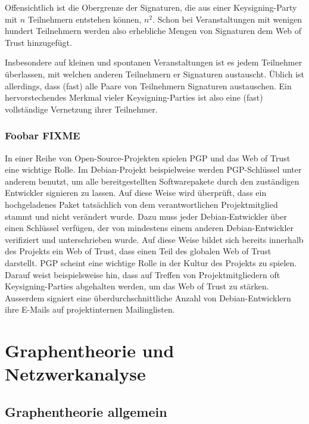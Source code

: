 Offensichtlich ist die Obergrenze der Signaturen, die aus einer
Keysigning-Party mit $n$ Teilnehmern entstehen k\"onnen, $n^2$. Schon
bei Veranstaltungen mit wenigen hundert Teilnehmern werden also
erhebliche Mengen von Signaturen dem Web of Trust hinzugef\"ugt.

Insbesondere auf kleinen und spontanen Veranstaltungen ist es jedem
Teilnehmer \"uberlassen, mit welchen anderen Teilnehmern er Signaturen
austauscht. \"Ublich ist allerdings, dass (fast) alle Paare von
Teilnehmern Signaturen austauschen. Ein hervorstechendes Merkmal
vieler Keysigning-Parties ist also eine (fast) vollst\"andige
Vernetzung ihrer Teilnehmer.


\subsubsection{Foobar FIXME}
\label{sec:foobar-fixme}

In einer Reihe von Open-Source-Projekten spielen PGP und das Web of
Trust eine wichtige Rolle. Im Debian-Projekt beispielweise werden
PGP-Schl\"ussel unter anderem benutzt, um alle bereitgestellten
Softwarepakete durch den zust\"andigen Entwickler signieren zu
lassen. Auf diese Weise wird \"uberpr\"uft, dass ein hochgeladenes
Paket tats\"achlich von dem verantwortlichen Projektmitglied stammt
und nicht ver\"andert wurde. Dazu muss jeder Debian-Entwickler \"uber
einen Schl\"ussel verf\"ugen, der von mindestens einem anderen
Debian-Entwickler verifiziert und unterschrieben wurde. Auf diese
Weise bildet sich bereits innerhalb des Projekts ein Web of Trust,
dass einen Teil des globalen Web of Trust darstellt. PGP scheint eine
wichtige Rolle in der Kultur des Projekts zu spielen. Darauf weist
beispielsweise hin, dass auf Treffen von Projektmitgliedern oft
Keysigning-Parties abgehalten werden, um das Web of Trust zu
st\"arken. Ausserdem signiert eine \"uberdurchschnittliche Anzahl von
Debian-Entwicklern ihre E-Mails auf projektinternen Mailinglisten.

\section{Graphentheorie und Netzwerkanalyse}
\label{sec:graph-und-netzw}

\subsection{Graphentheorie allgemein}
\label{ch:Grundlagen:sec:Graphentheorie}

